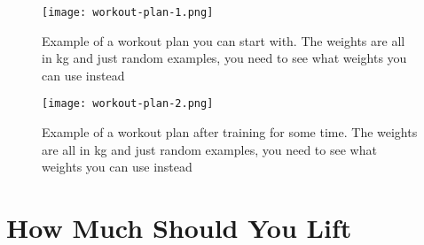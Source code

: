 \documentclass[openany, 12pt]{book}
\begin{document}
	\begin{figure}[h]
		\centering
		\texttt{[image: workout-plan-1.png]}
		\caption{Example of a workout plan you can start with. The weights are all in kg and just random examples, you need to see what weights you can use instead}
		\label{fig11}
	\end{figure}

	\begin{figure}[h]
		\centering
		\texttt{[image: workout-plan-2.png]}
		\caption{Example of a workout plan after training for some time. The weights are all in kg and just random examples, you need to see what weights you can use instead}
		\label{fig12}
	\end{figure}

        \section{How Much Should You Lift}
\end{document}
